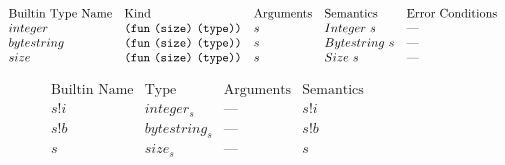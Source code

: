 \documentclass[../main.tex]{subfiles}
\begin{document}
    
\begin{figure*}[t]
    \footnotesize
    \centering
    
    \[\begin{array}{lllll}
        \textrm{Builtin Type Name} & \textrm{Kind} & \textrm{Arguments} & \textrm{Semantics} & \textrm{Error Conditions}\\
        
        integer & \texttt{(} \texttt{fun} ~ \texttt{(} \texttt{size} \texttt{)}{} ~ \texttt{(} \texttt{type} \texttt{)}{} \texttt{)} & s & Integer \  s & \textrm{---}\\
        
        bytestring & \texttt{(} \texttt{fun} ~ \texttt{(} \texttt{size} \texttt{)}{} ~ \texttt{(} \texttt{type} \texttt{)}{} \texttt{)} & s & Bytestring \  s & \textrm{---}\\
        
        size & \texttt{(} \texttt{fun} ~ \texttt{(} \texttt{size} \texttt{)}{} ~ \texttt{(} \texttt{type} \texttt{)}{} \texttt{)} & s & Size \  s & \textrm{---}\\
    \end{array}\]
    
    \[\begin{array}{lllll}
        \textrm{Builtin Name} & \textrm{Type} & \textrm{Arguments} & \textrm{Semantics}\\
        
        s!i   & integer_s      &   \textrm{---}   &    s!i\\
        
        s!b   & bytestring_s   &   \textrm{---}   &    s!b    &\\
        
        s     & size_s         &   \textrm{---}   &    s      &\\
        

\end{array}\]
\end{figure*}
\end{document}

